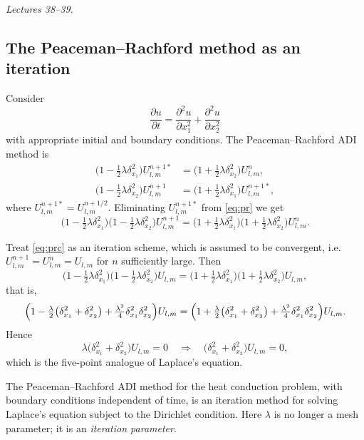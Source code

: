 \documentclass[11pt,a4paper]{article}
\numberwithin{equation}{section}
\theoremstyle{spacedplain}
\theoremstyle{spaceddefinition}
\theoremstyle{spacedremark}
\newcommand{\lecinfo}[1]{\noindent\textit{#1}\par}
\newcommand{\pd}[2]{\frac{\partial #1}{\partial #2}}
\newcommand{\pdd}[2]{\frac{\partial^2 #1}{\partial #2^2}}
\begin{document}
\lecinfo{Lectures 38--39.}

\subsection{The Peaceman--Rachford method as an iteration}

Consider
\[
  \pd ut=\pdd u{x_1}+\pdd u{x_2}
\]
with appropriate initial and boundary conditions.  The
Peaceman--Rachford ADI method is
\begin{equation}\label{eq:pr}
\begin{aligned}
  \bigl(1-\tfrac12\lambda\delta_{x_1}^2\bigr)U_{l,m}^{n+1*}
  &=\bigl(1+\tfrac12\lambda\delta_{x_2}^2\bigr)U_{l,m}^n,\\
  \bigl(1-\tfrac12\lambda\delta_{x_2}^2\bigr)U_{l,m}^{n+1}
  &=\bigl(1+\tfrac12\lambda\delta_{x_1}^2\bigr)U_{l,m}^{n+1*},
\end{aligned}
\end{equation}
where \(U_{l,m}^{n+1*}=U_{l,m}^{n+1/2}\).  Eliminating
\(U_{l,m}^{n+1*}\) from \eqref{eq:pr} we get
\begin{equation}\label{eq:prc}
  \bigl(1-\tfrac12\lambda\delta_{x_1}^2\bigr)
  \bigl(1-\tfrac12\lambda\delta_{x_2}^2\bigr)U_{l,m}^{n+1}
  =\bigl(1+\tfrac12\lambda\delta_{x_1}^2\bigr)
  \bigl(1+\tfrac12\lambda\delta_{x_2}^2\bigr)U_{l,m}^n .
\end{equation}

Treat \eqref{eq:prc} as an iteration scheme, which is assumed to be
convergent, i.e.\ \(U_{l,m}^{n+1}=U_{l,m}^n=U_{l,m}\) for \(n\)
sufficiently large.  Then
\[
  \bigl(1-\tfrac12\lambda\delta_{x_1}^2\bigr)
  \bigl(1-\tfrac12\lambda\delta_{x_2}^2\bigr)U_{l,m}
  =\bigl(1+\tfrac12\lambda\delta_{x_1}^2\bigr)
  \bigl(1+\tfrac12\lambda\delta_{x_2}^2\bigr)U_{l,m},
\]
that is,
\[
  \Bigl(1-\tfrac\lambda2\bigl(\delta_{x_1}^2+\delta_{x_2}^2\bigr)
  +\tfrac{\lambda^2}4\delta_{x_1}^2\delta_{x_2}^2\Bigr)U_{l,m}
  =\Bigl(1+\tfrac\lambda2\bigl(\delta_{x_1}^2+\delta_{x_2}^2\bigr)
  +\tfrac{\lambda^2}4\delta_{x_1}^2\delta_{x_2}^2\Bigr)U_{l,m}.
\]
Hence
\[
  \lambda\bigl(\delta_{x_1}^2+\delta_{x_2}^2\bigr)U_{l,m}=0
  \quad\Longrightarrow\quad
  \bigl(\delta_{x_1}^2+\delta_{x_2}^2\bigr)U_{l,m}=0,
\]
which is the five-point analogue of Laplace's equation.

\begin{keybox}
The Peaceman--Rachford ADI method for the heat conduction problem,
with boundary conditions independent of time, is an iteration method
for solving Laplace's equation subject to the Dirichlet condition.
Here \(\lambda\) is no longer a mesh parameter; it is an
\emph{iteration parameter}.
\end{keybox}
\end{document}
